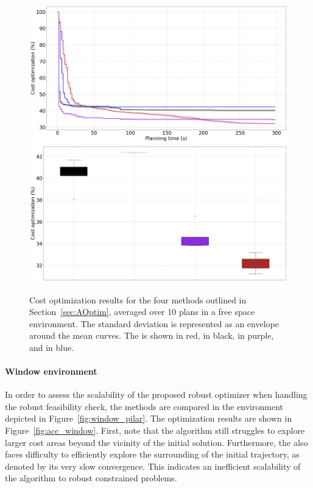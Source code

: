 \begin{figure} [htp]
    \centering
    \includegraphics[width=0.9\linewidth]{figures/accuracy/all_methods_empty.png} \\
    \includegraphics[width=0.9\linewidth]{figures/accuracy/bplot_all_methods_empty.png}
    \caption{Cost optimization results for the four methods outlined in Section~\ref{sec:AOptim}, averaged over 10 plans in a free space environment. 
    The standard deviation is represented as an envelope around the mean curves.
    The  is shown in red,  in black,  in purple, and  in blue.}%
    \label{fig:acc_empty}%
\end{figure}

\paragraph{Window environment}

In order to assess the scalability of the proposed robust optimizer when handling the robust feasibility check, the methods are compared in the environment depicted in Figure~\ref{fig:window_pilar}.
The optimization results are shown in Figure~\ref{fig:acc_window}.
First, note that the  algorithm still struggles to explore larger cost areas beyond the vicinity of the initial solution.
Furthermore, the  also faces difficulty to efficiently explore the surrounding of the initial trajectory, as denoted by its very slow convergence.
This indicates an inefficient scalability of the algorithm to robust constrained problems.

